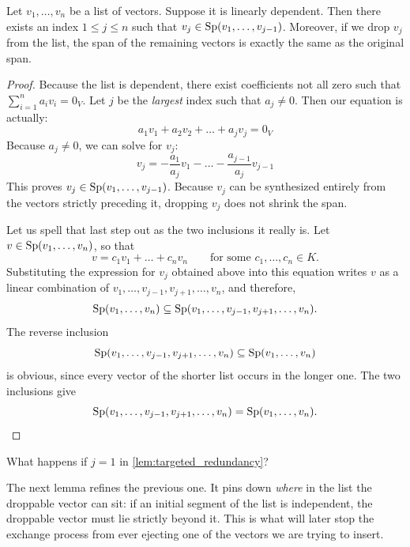 \begin{lemma}
\label{lem:targeted_redundancy}
Let $v_1, \dots, v_n$ be a list of vectors. Suppose it is linearly dependent. Then there exists an index $1 \le j \le n$ such that $v_j \in \operatorname{Sp}(v_1, \dots, v_{j-1})$. Moreover, if we drop $v_j$ from the list, the span of the remaining vectors is exactly the same as the original span.
\end{lemma}

\begin{proof}
Because the list is dependent, there exist coefficients not all zero such that $\sum_{i=1}^n a_i v_i = 0_V$. Let $j$ be the \textit{largest} index such that $a_j \ne 0$. Then our equation is actually:
\[
a_1 v_1 + a_2 v_2 + \dots + a_j v_j = 0_V
\]
Because $a_j \ne 0$, we can solve for $v_j$:
\[
v_j = -\frac{a_1}{a_j} v_1 - \dots - \frac{a_{j-1}}{a_j} v_{j-1}
\]
This proves $v_j \in \operatorname{Sp}(v_1, \dots, v_{j-1})$. Because $v_j$ can be synthesized entirely from the vectors strictly preceding it, dropping $v_j$ does not shrink the span.

Let us spell that last step out as the two inclusions it really is. Let $v \in \operatorname{Sp}(v_1, \dots, v_n)$, so that
\[
v = c_1 v_1 + \dots + c_n v_n \qquad \text{for some } c_1, \dots, c_n \in K.
\]
Substituting the expression for $v_j$ obtained above into this equation writes $v$ as a linear combination of $v_1, \dots, v_{j-1}, v_{j+1}, \dots, v_n$, and therefore,
\[
\operatorname{Sp}(v_1, \dots, v_n) \subseteq \operatorname{Sp}(v_1, \dots, v_{j-1}, v_{j+1}, \dots, v_n).
\]
The reverse inclusion
\[
\operatorname{Sp}(v_1, \dots, v_{j-1}, v_{j+1}, \dots, v_n) \subseteq \operatorname{Sp}(v_1, \dots, v_n)
\]
is obvious, since every vector of the shorter list occurs in the longer one. The two inclusions give
\[
\operatorname{Sp}(v_1, \dots, v_{j-1}, v_{j+1}, \dots, v_n) = \operatorname{Sp}(v_1, \dots, v_n). \qedhere
\]
\end{proof}

\begin{exercise}[The Boundary Case $j = 1$ in \cref{lem:targeted_redundancy}]
\label{exc:redundancy_j_equals_one}
What happens if $j = 1$ in \cref{lem:targeted_redundancy}?
\end{exercise}

The next lemma refines the previous one. It pins down \emph{where} in the list the droppable vector can sit: if an initial segment of the list is independent, the droppable vector must lie strictly beyond it. This is what will later stop the exchange process from ever ejecting one of the vectors we are trying to insert.

